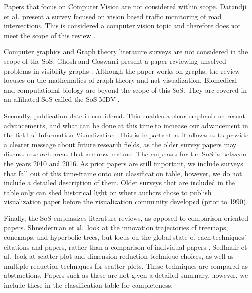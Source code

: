 Papers that focus on Computer Vision are not considered within scope. Datondji et al.\ present a survey focused on vision based traffic monitoring of road intersections. This is considered a computer vision topic and therefore does not meet the scope of this review \cite{datondji2016survey}.

Computer graphics and Graph theory literature surveys are not considered in the scope of the SoS. Ghosh and Goswami present a paper reviewing unsolved problems in visibility graphs \cite{ghosh2013unsolved}. Although the paper works on graphs, the review focuses on the mathematics of graph theory and not visualization. Biomedical and computational biology are beyond the scope of this SoS. They are covered in an affiliated SoS called the SoS-MDV \cite{alharbi2017molecular}. 

Secondly, publication date is considered. This enables a clear emphasis on recent advancements, and what can be done at this time to increase our advancement in the field of Information Visualization. This is important as it allows us to provide a clearer message about future research fields, as the older survey papers may discuss research areas that are now mature. The emphasis for the SoS is between the years 2010 and 2016. As prior papers are still important, we include surveys that fall out of this time-frame onto our classification table, however, we do not include a detailed description of them. Older surveys that are included in the table only can shed historical light on where authors chose to publish visualization paper before the visualization community developed (prior to 1990).

Finally, the SoS emphasizes literature reviews, as opposed to comparison-oriented papers. Shneiderman et al.\ look at the innovation trajectories of treemaps, conemaps, and hyperbolic trees, but focus on the global state of each techniques' citations and papers, rather than a comparison of individual papers \cite{schneiderman2012innovation}. Sedlmair et al.\ look at scatter-plot and dimension reduction technique choices, as well as multiple reduction techniques for scatter-plots. These techniques are compared as abstractions\cite{sedlmair2013empirical}. Papers such as these are not given a detailed summary, however, we include these in the classification table for completeness.




